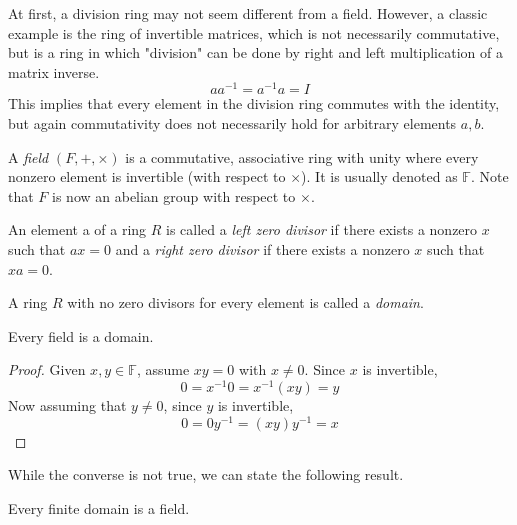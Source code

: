 \documentclass{article}
\begin{document}
    At first, a division ring may not seem different from a field. However, a classic example is the ring of invertible matrices, which is not necessarily commutative, but is a ring in which "division" can be done by right and left multiplication of a matrix inverse. 
    \begin{equation}
      a a^{-1} = a^{-1} a = I
    \end{equation}
    This implies that every element in the division ring commutes with the identity, but again commutativity does not necessarily hold for arbitrary elements $a, b$. 

    \begin{definition}
      A \textit{field} $(F, +, \times)$ is a commutative, associative ring with unity where every nonzero element is invertible (with respect to $\times$). It is usually denoted as $\mathbb{F}$. Note that $F$ is now an abelian group with respect to $\times$. 
    \end{definition}

    \begin{definition}
      An element a of a ring $R$ is called a \textit{left zero divisor} if there exists a nonzero $x$ such that $a x = 0$ and a \textit{right zero divisor} if there exists a nonzero $x$ such that $x a = 0$. 
    \end{definition}

    \begin{definition}
      A ring $R$ with no zero divisors for every element is called a \textit{domain}. 
    \end{definition}

    \begin{proposition}
      Every field is a domain. 
    \end{proposition}
    \begin{proof}
      Given $x, y \in \mathbb{F}$, assume $x y = 0$ with $x \neq 0$. Since $x$ is invertible,
      \begin{equation}
        0 = x^{-1} 0 = x^{-1} (x y) = y
      \end{equation}
      Now assuming that $y \neq 0$, since $y$ is invertible, 
      \begin{equation}
        0 = 0 y^{-1} = (x y) y^{-1} = x
      \end{equation}
    \end{proof}

    While the converse is not true, we can state the following result. 

    \begin{theorem}
      Every finite domain is a field. 
    \end{theorem}
\end{document}
